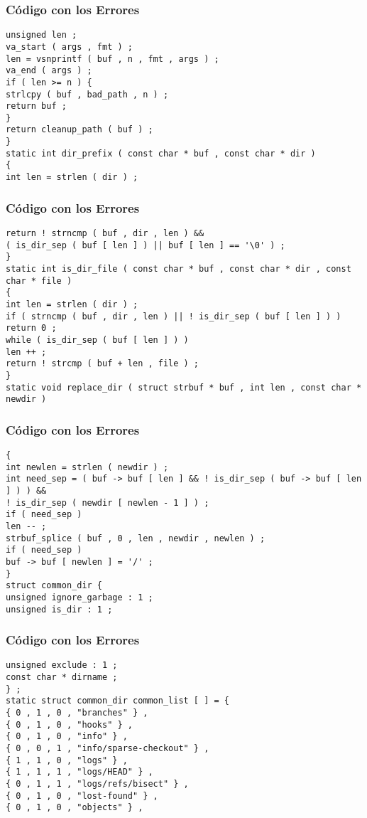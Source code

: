 \documentclass{beamer}
\begin{document}
\begin{frame}[fragile]
\frametitle{C\'odigo con los Errores}
\begin{verbatim}
unsigned len ; 
va_start ( args , fmt ) ; 
len = vsnprintf ( buf , n , fmt , args ) ; 
va_end ( args ) ; 
if ( len >= n ) { 
strlcpy ( buf , bad_path , n ) ; 
return buf ; 
} 
return cleanup_path ( buf ) ; 
} 
static int dir_prefix ( const char * buf , const char * dir ) 
{ 
int len = strlen ( dir ) ; 
\end{verbatim}
\end{frame}
\begin{frame}[fragile]
\frametitle{C\'odigo con los Errores}
\begin{verbatim}
return ! strncmp ( buf , dir , len ) && 
( is_dir_sep ( buf [ len ] ) || buf [ len ] == '\0' ) ; 
} 
static int is_dir_file ( const char * buf , const char * dir , const char * file ) 
{ 
int len = strlen ( dir ) ; 
if ( strncmp ( buf , dir , len ) || ! is_dir_sep ( buf [ len ] ) ) 
return 0 ; 
while ( is_dir_sep ( buf [ len ] ) ) 
len ++ ; 
return ! strcmp ( buf + len , file ) ; 
} 
static void replace_dir ( struct strbuf * buf , int len , const char * newdir ) 
\end{verbatim}
\end{frame}
\begin{frame}[fragile]
\frametitle{C\'odigo con los Errores}
\begin{verbatim}
{ 
int newlen = strlen ( newdir ) ; 
int need_sep = ( buf -> buf [ len ] && ! is_dir_sep ( buf -> buf [ len ] ) ) && 
! is_dir_sep ( newdir [ newlen - 1 ] ) ; 
if ( need_sep ) 
len -- ; 
strbuf_splice ( buf , 0 , len , newdir , newlen ) ; 
if ( need_sep ) 
buf -> buf [ newlen ] = '/' ; 
} 
struct common_dir { 
unsigned ignore_garbage : 1 ; 
unsigned is_dir : 1 ; 
\end{verbatim}
\end{frame}
\begin{frame}[fragile]
\frametitle{C\'odigo con los Errores}
\begin{verbatim}
unsigned exclude : 1 ; 
const char * dirname ; 
} ; 
static struct common_dir common_list [ ] = { 
{ 0 , 1 , 0 , "branches" } , 
{ 0 , 1 , 0 , "hooks" } , 
{ 0 , 1 , 0 , "info" } , 
{ 0 , 0 , 1 , "info/sparse-checkout" } , 
{ 1 , 1 , 0 , "logs" } , 
{ 1 , 1 , 1 , "logs/HEAD" } , 
{ 0 , 1 , 1 , "logs/refs/bisect" } , 
{ 0 , 1 , 0 , "lost-found" } , 
{ 0 , 1 , 0 , "objects" } , 
\end{verbatim}
\end{frame}
\end{document}
